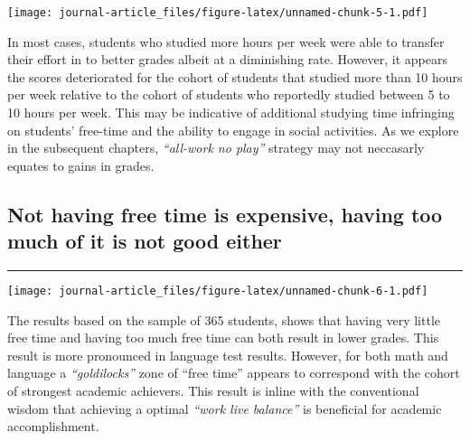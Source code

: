\documentclass[
]{article}
\newenvironment{Shaded}{\begin{snugshade}}{\end{snugshade}}
\newcommand{\DataTypeTok}[1]{\textcolor[rgb]{0.13,0.29,0.53}{#1}}
\newcommand{\DecValTok}[1]{\textcolor[rgb]{0.00,0.00,0.81}{#1}}
\newcommand{\KeywordTok}[1]{\textcolor[rgb]{0.13,0.29,0.53}{\textbf{#1}}}
\newcommand{\NormalTok}[1]{#1}
\newcommand{\OperatorTok}[1]{\textcolor[rgb]{0.81,0.36,0.00}{\textbf{#1}}}
\newcommand{\StringTok}[1]{\textcolor[rgb]{0.31,0.60,0.02}{#1}}
\begin{document}
\texttt{[image: journal-article\_files/figure-latex/unnamed-chunk-5-1.pdf]}

In most cases, students who studied more hours per week were able to
transfer their effort in to better grades albeit at a diminishing rate.
However, it appears the scores deteriorated for the cohort of students
that studied more than 10 hours per week relative to the cohort of
students who reportedly studied between 5 to 10 hours per week. This may
be indicative of additional studying time infringing on students'
free-time and the ability to engage in social activities. As we explore
in the subsequent chapters, \emph{``all-work no play''} strategy may not
neccasarly equates to gains in grades.

\hypertarget{not-having-free-time-is-expensive-having-too-much-of-it-is-not-good-either}{%
\subsection{Not having free time is expensive, having too much of it is
not good
either}\label{not-having-free-time-is-expensive-having-too-much-of-it-is-not-good-either}}

\begin{center}\rule{0.5\linewidth}{0.5pt}\end{center}

\begin{Shaded}
\end{Shaded}

\texttt{[image: journal-article\_files/figure-latex/unnamed-chunk-6-1.pdf]}

The results based on the sample of 365 students, shows that having very
little free time and having too much free time can both result in lower
grades. This result is more pronounced in language test results.
However, for both math and language a \emph{``goldilocks''} zone of
``free time'' appears to correspond with the cohort of strongest
academic achievers. This result is inline with the conventional wisdom
that achieving a optimal \emph{``work live balance''} is beneficial for
academic accomplishment.
\end{document}
